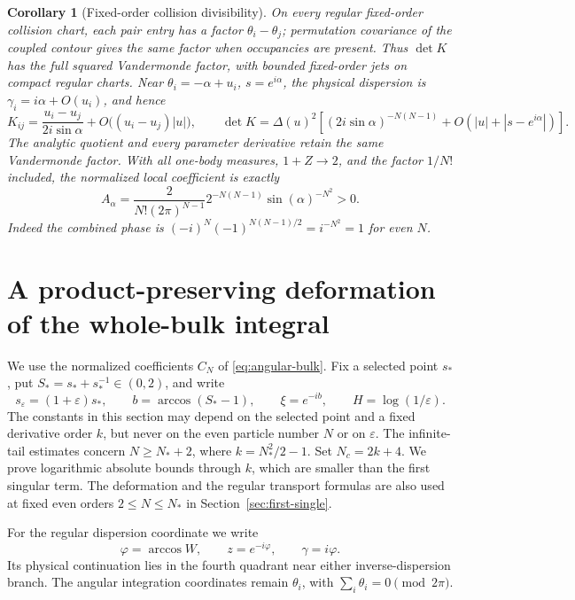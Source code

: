 \documentclass[11pt]{article}
\numberwithin{equation}{section}
\newtheorem{corollary}[theorem]{Corollary}
\theoremstyle{remark}\newtheorem{remark}[theorem]{Remark}
\begin{document}
\begin{corollary}[Fixed-order collision divisibility]
\label{lem:alternating-division}
On every regular fixed-order collision chart, each pair entry
has a factor $\theta_i-\theta_j$; permutation covariance of
the coupled contour gives the same factor when occupancies
are present.  Thus $\det K$ has the full squared Vandermonde
factor, with bounded fixed-order jets on compact regular
charts.  Near $\theta_i=-\alpha+u_i$, $s=e^{i\alpha}$, the
physical dispersion is $\gamma_i=i\alpha+O(u_i)$, and hence
\[
 K_{ij}=\frac{u_i-u_j}{2i\sin\alpha}
          +O\bigl((u_i-u_j)|u|\bigr),\qquad
 \det K=\Delta(u)^2\left[
 (2i\sin\alpha)^{-N(N-1)}+O(|u|+|s-e^{i\alpha}|)\right].
\]
The analytic quotient and every parameter derivative retain
the same Vandermonde factor.  With all one-body measures,
$1+Z\to2$, and the factor $1/N!$ included, the normalized
local coefficient is exactly
\[
 A_\alpha=\frac{2}{N!(2\pi)^{N-1}}
           2^{-N(N-1)}\sin(\alpha)^{-N^2}>0.
\]
Indeed the combined phase is
$(-i)^N(-1)^{N(N-1)/2}=i^{-N^2}=1$ for even $N$.
\end{corollary}

\section{A product-preserving deformation of the whole-bulk integral}
\label{sec:constrained-deformation}

We use the normalized coefficients $C_N$ of
\eqref{eq:angular-bulk}.  Fix a selected point $s_*$, put
$S_*=s_*+s_*^{-1}\in(0,2)$, and write
\[
 s_\varepsilon=(1+\varepsilon)s_*,\qquad
 b=\arccos(S_*-1),\qquad \xi=e^{-ib},\qquad
 H=\log(1/\varepsilon).
\]
The constants in this section may depend on the selected point and a
fixed derivative order $k$, but never on the even particle number $N$
or on $\varepsilon$.  The infinite-tail estimates concern $N\ge N_*+2$, where
$k=N_*^2/2-1$. Set $N_c=2k+4$.
We prove logarithmic absolute bounds through $k$, which are
smaller than the first singular term. The deformation and the regular transport formulas
are also used at fixed even orders $2\le N\le N_*$ in
Section~\ref{sec:first-single}.

For the regular dispersion coordinate we write
\[
 \varphi=\arccos W,\qquad z=e^{-i\varphi},\qquad
 \gamma=i\varphi.
\]
Its physical continuation lies in the fourth quadrant near either
inverse-dispersion branch.  The angular integration coordinates remain
$\theta_i$, with $\sum_i\theta_i=0\pmod {2\pi}$.
\end{document}
